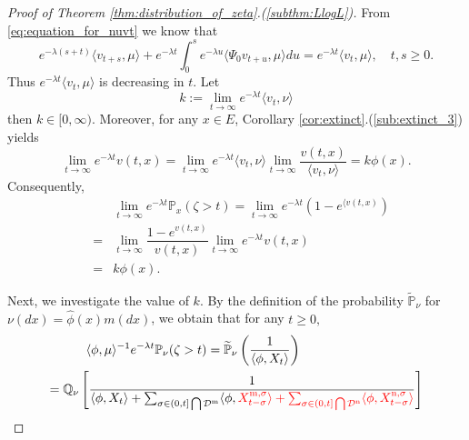 \documentclass[12pt,a4paper]{amsart}
\numberwithin{equation}{section}
\theoremstyle{plain}
\theoremstyle{definition}
\begin{document}
\begin{proof}[Proof of Theorem \ref{thm:distribution_of_zeta}.(\ref{subthm:LlogL})]
    From \eqref{eq:equation_for_nuvt} we know that
  \begin{equation}\label{eq:ext_equ_int}
    e^{-\lambda(s+t)}\langle v_{t+s}, \mu\rangle + e^{-\lambda t}\int_0^s e^{-\lambda u}\langle \Psi_0v_{t+u},\mu\rangle du
=e^{-\lambda t}\langle v_t,\mu\rangle,
\quad t,s\geq 0. 
  \end{equation}
	Thus $e^{-\lambda t}\langle v_t, \mu\rangle$ is decreasing in $t$. 
  Let
\begin{equation}\label{eq:def_of_k}
    k:=
    \lim_{t\to\infty}e^{-\lambda t}\langle v_t, \nu\rangle
\end{equation}
then $k\in[0,\infty)$. Moreover, for any $x\in E$, Corollary \ref{cor:extinct}.(\ref{sub:extinct_3}) yields
  \[
    \lim_{t\rightarrow\infty}e^{-\lambda t}v(t,x)=\lim_{t\to\infty}e^{-\lambda t}\langle v_t,\nu\rangle \lim_{t\to\infty}\dfrac{v(t,x)}{\langle v_t,\nu\rangle }=k\phi(x).
  \]
	Consequently,
  \begin{eqnarray*}
    &&\lim_{t\rightarrow\infty}e^{-\lambda t}\mathbb P_{x}(\zeta>t)=\lim_{t\rightarrow\infty}e^{-\lambda t}\left(1-e^{\langle v(t,x)}\right)\\	
    &=&\lim_{t\rightarrow\infty}\dfrac{1-e^{ v(t,x)}}{v(t,x)}\lim_{t\to\infty}e^{-\lambda t}v(t,x)\\
    &=& k\phi(x).
  \end{eqnarray*}

	Next, we investigate the value of $k$.  By the definition of the probability $\widetilde{\mathbb P}_\nu$ for $\nu(dx)=\widehat\phi(x)m(dx)$, we obtain that for any $t\ge 0,$
  \begin{align}\label{eq:subcritical_equality}
    \langle\phi,\mu\rangle ^{-1}e^{-\lambda t}\mathbb P_\nu(\zeta>t)=\widetilde{\mathbb P}_\nu\left(\frac{1}{\langle\phi, X_{t}\rangle }\right)\hspace*{3.4 true cm}\\
    =\mathbb Q_{\nu}\left[\frac{1}{\langle\phi, X_{t}\rangle +\sum_{\sigma\in(0, t]\bigcap\mathcal D^{\mathrm m}}\langle \phi, {\color{red}X_{t-\sigma}^{{\mathrm m},\sigma}\rangle +\sum_{\sigma\in (0, t]\bigcap \mathcal D^{\mathrm n}}\langle \phi, X_{t-\sigma}^{{\mathrm n}, \sigma}\rangle} }\right]
  \end{align}


\end{proof}
\end{document}
